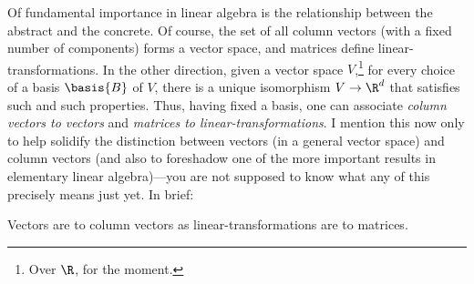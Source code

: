 Of fundamental importance in linear algebra is the relationship between the abstract and the concrete.  Of course, the set of all column vectors (with a fixed number of components) forms a vector space, and matrices define linear-transformations.  In the other direction, given a vector space $V$,\footnote{Over $\R$, for the moment.} for every choice of a basis $\basis{B}$ of $V$, there is a unique isomorphism $V\rightarrow \R ^d$ that satisfies such and such properties.  Thus, having fixed a basis, one can associate \emph{column vectors to vectors} and \emph{matrices to linear-transformations}.  I mention this now only to help solidify the distinction between vectors (in a general vector space) and column vectors (and also to foreshadow one of the more important results in elementary linear algebra)---you are not supposed to know what any of this precisely means just yet.  In brief:
\begin{displayquote}
	Vectors are to column vectors as linear-transformations are to matrices.
\end{displayquote}

